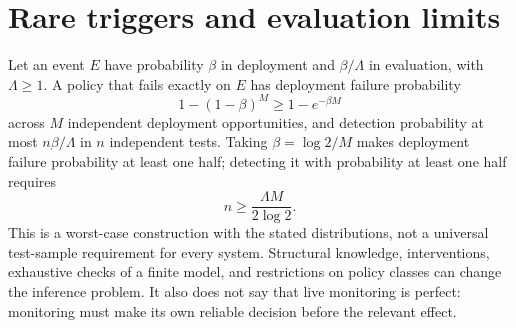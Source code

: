 \section{Rare triggers and evaluation limits}
\label{app:audit}
Let an event $E$ have probability $\beta$ in deployment and $\beta/\Lambda$ in evaluation, with $\Lambda\ge1$. A policy that fails exactly on $E$ has deployment failure probability
\[
1-(1-\beta)^M\ge1-e^{-\beta M}
\]
across $M$ independent deployment opportunities, and detection probability at most $n\beta/\Lambda$ in $n$ independent tests. Taking $\beta=\log 2/M$ makes deployment failure probability at least one half; detecting it with probability at least one half requires
\[
n\ge\frac{\Lambda M}{2\log2}.
\]
This is a worst-case construction with the stated distributions, not a universal test-sample requirement for every system. Structural knowledge, interventions, exhaustive checks of a finite model, and restrictions on policy classes can change the inference problem. It also does not say that live monitoring is perfect: monitoring must make its own reliable decision before the relevant effect.
